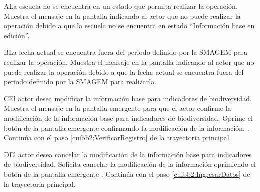     \begin{UCtrayectoriaA}{A}{La escuela no se encuentra en un estado que permita realizar la operación.}
    \UCpaso[\UCsist] Muestra el mensaje  en la pantalla  indicando al actor que no puede realizar la operación debido a que la escuela no se encuentra en estado ``Información base en edición''. 
 \end{UCtrayectoriaA}

   \begin{UCtrayectoriaA}{B}{La fecha actual se encuentra fuera del periodo definido por la SMAGEM para realizar la operación.}
    \UCpaso[\UCsist] Muestra el mensaje  en la pantalla  indicando al actor que no puede realizar la operación debido a que la fecha actual se encuentra fuera del periodo definido por la SMAGEM para realizarla. 
 \end{UCtrayectoriaA}
 
  \begin{UCtrayectoriaA}{C}{El actor desea modificar la información base para indicadores de biodiversidad.}
    \UCpaso[\UCsist] Muestra el mensaje  en la pantalla emergente  para que el actor confirme la modificación de la información base para indicadores de biodiversidad.
    \UCpaso[\UCactor] Oprime el botón  de la pantalla emergente  confirmando la modificación de la información. .
    \UCpaso[] Continúa con el paso \ref{cuibb2:VerificarRegistro} de la trayectoria principal.    
 \end{UCtrayectoriaA}
 
   \begin{UCtrayectoriaA}{D}{El actor desea cancelar la modificación de la información base para indicadores de biodiversidad.}
    \UCpaso[\UCactor] Solicita cancelar la modificación de la información oprimiendo el botón  de la pantalla emergente .
    \UCpaso[] Continúa con el paso \ref{cuibb2:IngresarDatos} de la trayectoria principal.    
 \end{UCtrayectoriaA}
 
